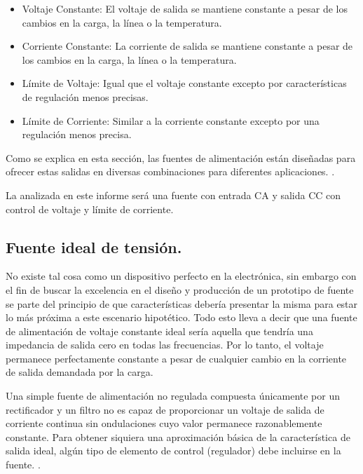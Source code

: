 \begin{itemize}
    \item Voltaje Constante: El voltaje de salida se mantiene constante a pesar de los cambios en la carga, la línea o la temperatura.
    \item Corriente Constante: La corriente de salida se mantiene constante a pesar de los cambios en la carga, la línea o la temperatura.
    \item Límite de Voltaje: Igual que el voltaje constante excepto por características de regulación menos precisas.
    \item Límite de Corriente: Similar a la corriente constante excepto por una regulación menos precisa.
\end{itemize} \par 
Como se explica en esta sección, las fuentes de alimentación están diseñadas para ofrecer estas salidas en diversas combinaciones para diferentes aplicaciones. \cite{agilent2000}. \par 
La analizada en este informe será una fuente con entrada CA y salida CC con control de voltaje y límite de corriente.

\subsection{Fuente ideal de  tensión.} \par 
No existe tal cosa como un dispositivo perfecto en la electrónica, sin embargo con el fin de buscar la excelencia en el diseño y producción de un prototipo de fuente se parte del principio de que características debería presentar la misma para estar lo más próxima a este escenario hipotético. Todo esto lleva a decir que una fuente de alimentación de voltaje constante ideal sería aquella que tendría una impedancia de salida cero en todas las frecuencias. Por lo tanto, el voltaje permanece perfectamente constante a pesar de cualquier cambio en la corriente de salida demandada por la carga. \par 
Una simple fuente de alimentación no regulada compuesta únicamente por un rectificador y un filtro no es capaz de proporcionar un voltaje de salida de corriente continua sin ondulaciones cuyo valor permanece razonablemente constante. Para obtener siquiera una aproximación básica de la característica de salida ideal, algún tipo de elemento de control (regulador) debe incluirse en la fuente. \cite{agilent2000}. 

